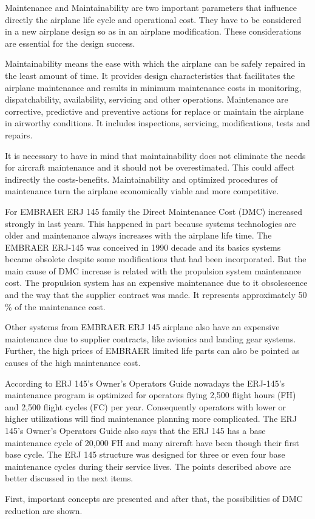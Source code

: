 Maintenance and Maintainability are two important parameters that influence directly the airplane life cycle and operational cost. They have to be considered in a new airplane design so as in an airplane modification. These considerations are essential for the design success.

Maintainability means the ease with which the airplane can be safely repaired in the least amount of time. It provides design characteristics that facilitates the airplane maintenance and results in minimum maintenance costs in monitoring, dispatchability, availability, servicing and other operations. Maintenance are corrective, predictive and preventive actions for replace or maintain the airplane in airworthy conditions. It includes inspections, servicing, modifications, tests and repairs.

It is necessary to have in mind that maintainability does not eliminate the needs for aircraft maintenance and it should not be overestimated. This could affect indirectly the costs-benefits. Maintainability and optimized procedures of maintenance turn the airplane economically viable and more competitive.

For EMBRAER ERJ 145 family the Direct Maintenance Cost (DMC) increased strongly in last years. This happened in part because systems technologies are older and maintenance always increases with the airplane life time. The EMBRAER ERJ-145 was conceived in 1990 decade and its basics systems became obsolete despite some modifications that had been incorporated. But the main cause of DMC increase is related with the propulsion system maintenance cost. The propulsion system has an expensive maintenance due to it obsolescence and the way that the supplier contract was made. It represents approximately 50 \% of the maintenance cost.

Other systems from EMBRAER ERJ 145 airplane also have an expensive maintenance due to supplier contracts, like avionics and landing gear systems. Further, the high prices of EMBRAER limited life parts can also be pointed as causes of the high maintenance cost.

According to ERJ 145's Owner's Operators Guide nowadays the ERJ-145's maintenance program is optimized for operators flying 2,500 flight hours (FH) and 2,500 flight cycles (FC) per year. Consequently operators with lower or higher utilizations will find maintenance planning more complicated. The ERJ 145's Owner's Operators Guide also says that the ERJ 145 has a base maintenance cycle of 20,000 FH and many aircraft have been though their first base cycle. The ERJ 145 structure was designed for three or even four base maintenance cycles during their service lives. The points described above are better discussed in the next items.

First, important concepts are presented and after that, the possibilities of DMC reduction are shown.
